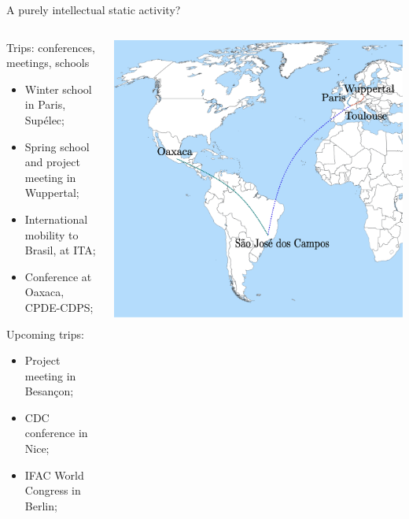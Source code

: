 \documentclass[aspectratio=169]{ISAE-Beamer}
\begin{document}
\begin{frame}{A purely intellectual static activity?}
\begin{columns}
	\begin{column}{0.5\textwidth}
		Trips: conferences, meetings, schools
		\begin{itemize}
			\item Winter school in Paris, Sup\'elec;
			\item Spring school and project meeting in Wuppertal;
			\item International mobility to Brasil, at ITA;
			\item Conference at Oaxaca, CPDE-CDPS;
		\end{itemize}
	Upcoming trips:
	\begin{itemize}
		\item Project meeting in Besançon;
		\item CDC conference in Nice;
		\item IFAC World Congress in Berlin;
	\end{itemize}
	\end{column}
	\begin{column}{0.5\textwidth}
		\centering
		\includegraphics[height=0.8\textheight]{world_trip.eps}
	\end{column}
\end{columns}
\end{frame}
\end{document}
